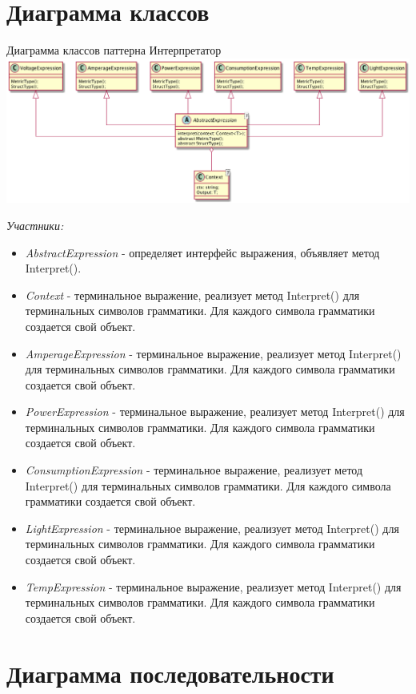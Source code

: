 \documentclass[PI,LAB]{HSEUniversity}
\begin{document}
\section{Диаграмма классов}
\begin{FIGURE}[h]{Диаграмма классов паттерна Интерпретатор\label{fig:example-figure}}
    \includegraphics[width=1\textwidth]{../out/diagrams/interpreter-ts-class/interpreter-ts-class}
\end{FIGURE}
\emph{Участники:}
\begin{itemize}
    \item \emph{AbstractExpression} - определяет интерфейс выражения, объявляет метод Interpret().
    \item \emph{Context} - терминальное выражение, реализует метод Interpret() для терминальных символов грамматики. Для каждого символа грамматики создается свой объект.
    \item \emph{AmperageExpression} -  терминальное выражение, реализует метод Interpret() для терминальных символов грамматики. Для каждого символа грамматики создается свой объект.
    \item \emph{PowerExpression} - терминальное выражение, реализует метод Interpret() для терминальных символов грамматики. Для каждого символа грамматики создается свой объект.
    \item \emph{ConsumptionExpression} - терминальное выражение, реализует метод Interpret() для терминальных символов грамматики. Для каждого символа грамматики создается свой объект.
    \item \emph{LightExpression} - терминальное выражение, реализует метод Interpret() для терминальных символов грамматики. Для каждого символа грамматики создается свой объект.
    \item \emph{TempExpression} - терминальное выражение, реализует метод Interpret() для терминальных символов грамматики. Для каждого символа грамматики создается свой объект.
\end{itemize}
\pagebreak
\section{Диаграмма последовательности }
\end{document}
